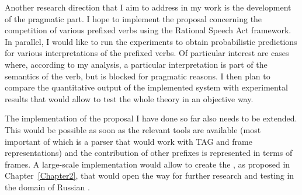 Another research direction that I aim to address in my  work is the development of the pragmatic part. I hope to implement the proposal concerning the competition of various prefixed verbs using the Rational Speech Act framework. In parallel, I would like to run the experiments to obtain probabilistic predictions for various interpretations of the prefixed verbs.  Of particular interest are cases where, according to my analysis, a particular interpretation is part of the semantics of the verb, but is blocked for pragmatic reasons. I then plan to compare the quantitative output of the implemented system with experimental results that would allow to test the whole theory in an objective way.

The implementation of the proposal I have done so far also needs to be extended. This would be possible as soon as the relevant tools are available (most important of which is a parser that would work with TAG and frame representations) and the contribution of other prefixes is represented in terms of frames. A large-scale implementation would allow to create the , as proposed in Chapter~\ref{Chapter2}, that would open the way for further research and testing in the domain of Russian . 
